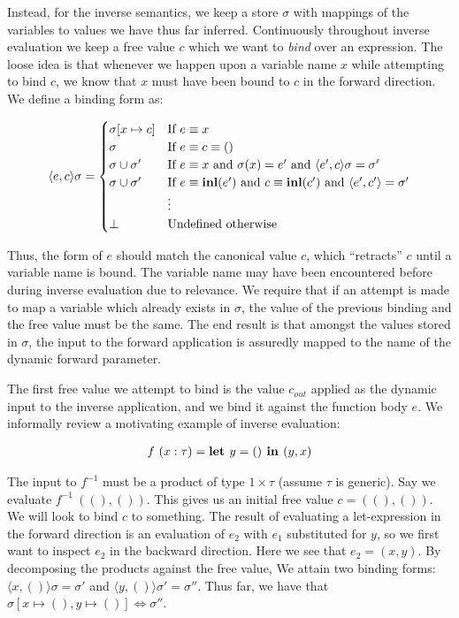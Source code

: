 Instead, for the inverse semantics, we keep a store $\sigma$ with mappings of
the variables to values we have thus far inferred. Continuously throughout
inverse evaluation we keep a free value $c$ which we want to \emph{bind} over
an expression. The loose idea is that whenever we happen upon a variable name $x$
while attempting to bind $c$, we know that $x$ must have been bound to $c$ in
the forward direction. We define a binding form as:

\begin{align*}
  \langle e, c \rangle \sigma =
  \begin{cases}
    \sigma[x \mapsto c] &\text{If $e \equiv x$} \\
    \sigma              &\text{If $e \equiv c \equiv ()$} \\
    \sigma \cup \sigma' &\text{If $e \equiv x$ and $\sigma(x) = e'$ and
                               $\langle e', c \rangle \sigma = \sigma'$} \\
    \sigma \cup \sigma' &\text{If $e \equiv \textbf{inl}(e')$ and $c \equiv \textbf{inl}(c')$ and
                               $\langle e', c' \rangle = \sigma'$} \\
                        &\vdots \\
    \bot                &\text{Undefined otherwise}
  \end{cases}
\end{align*}

Thus, the form of $e$ should match the canonical value $c$, which ``retracts''
$c$ until a variable name is bound. The variable name may have been encountered
before during inverse evaluation due to relevance. We require that if an
attempt is made to map a variable which already exists in $\sigma$, the value
of the previous binding and the free value must be the same. The end result is
that amongst the values stored in $\sigma$, the input to the forward
application is assuredly mapped to the name of the dynamic forward parameter.

The first free value we attempt to bind is the value $c_{out}$ applied as the
dynamic input to the inverse application, and we bind it against the function
body $e$. We informally review a motivating example of inverse evaluation:

\begin{align}
  f~(x:\tau) = \textbf{let } y = () \textbf{ in } (y, x)
  \label{prog:inverse_example}
\end{align}

The input to $f^{-1}$ must be a product of type $1 \times \tau$ (assume $\tau$
is generic). Say we evaluate $f^{-1}~((), ())$. This gives us an initial free
value $c = ((), ())$. We will look to bind $c$ to something. The result of
evaluating a let-expression in the forward direction is an evaluation of $e_2$
with $e_1$ substituted for $y$, so we first want to inspect $e_2$ in the
backward direction. Here we see that $e_2 = (x, y)$. By decomposing the
products against the free value, We attain two binding forms: $\langle x, ()
\rangle \sigma = \sigma'$ and $\langle y, () \rangle \sigma' = \sigma''$. Thus
far, we have that $\sigma[x \mapsto (), y \mapsto ()] \Leftrightarrow
\sigma''$.

